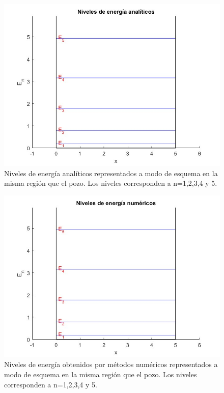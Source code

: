 \documentclass[12pt]{article}
\begin{document}
     \begin{figure}[H]
         \centering
         \includegraphics[width=1.05\linewidth]{fotos/energia_infin_analitica.jpg}
         \caption{Niveles de energía analíticos representados a modo de esquema en la misma región que el pozo. Los niveles corresponden a n=1,2,3,4 y 5.}
     \end{figure}

     \begin{figure}[H]
         \centering
         \includegraphics[width=1.05\linewidth]{fotos/energia_infin_numerica.jpg}
         \caption{Niveles de energía obtenidos por métodos numéricos representados a modo de esquema en la misma región que el pozo. Los niveles corresponden a n=1,2,3,4 y 5.}
     \end{figure}
\end{document}
